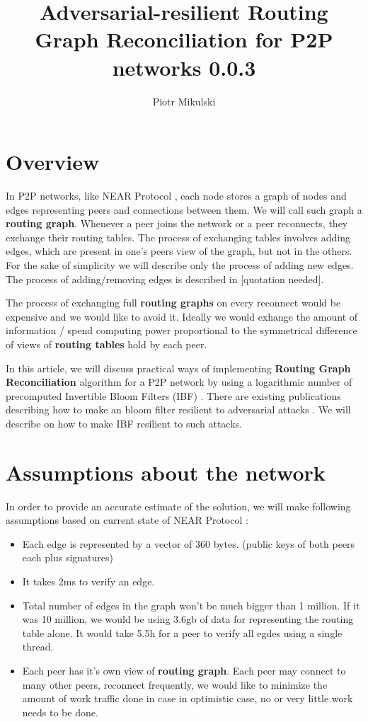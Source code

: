\documentclass[11pt]{article}
\title{\textbf{Adversarial-resilient  Routing Graph Reconciliation for P2P networks 0.0.3}}
\author{Piotr Mikulski}
\date{}
\begin{document}
\maketitle
\thispagestyle{empty}

\section{Overview}
In P2P networks, like NEAR Protocol \cite{near}, each node stores a graph of nodes and edges representing peers and connections between them.
We will call such graph a \textbf{routing graph}.
Whenever a peer joins the network or a peer reconnects, they exchange their routing tables.
The process of exchanging tables involves adding edges, which are present in one's peers view of the graph, but not in the others.
For the sake of simplicity we will describe only the process of adding new edges.
The process of adding/removing edges is described in [quotation needed].

The process of exchanging full \textbf{routing graphs} on every reconnect would be expensive and we would like to avoid it.
Ideally we would exhange the amount of information / spend computing power proportional to the symmetrical difference of views of \textbf{routing tables} hold by each peer.

In this article, we will discuss practical ways of implementing \textbf{Routing Graph Reconciliation} algorithm for a P2P network by using a logarithmic number of precomputed Invertible Bloom Filters (IBF)
 \cite{esrwpc}.
There are existing publications describing how to make an bloom filter resilient to adversarial attacks \cite{adversarial}.
We will describe on how to make IBF resilient to such attacks.

\section{Assumptions about the network}
In order to provide an accurate estimate of the solution, we will make following assumptions based on current state of NEAR Protocol \cite{near}:
\begin{itemize}
\item Each edge is represented by a vector of 360 bytes. (public keys of both peers each plus signatures)
\item It takes 2ms to verify an edge.
\item Total number of edges in the graph won't be much bigger than 1 million.
If it was 10 million, we would be using 3.6gb of data for representing the routing table alone.
It would take 5.5h for a peer to verify all egdes using a single thread.
\item Each peer has it's own view of \textbf{routing graph}.
Each peer may connect to many other peers, reconnect frequently, we would like to minimize the amount of work traffic done in case in optimistic case, no or very little work needs to be done.

\end{itemize}
\end{document}
